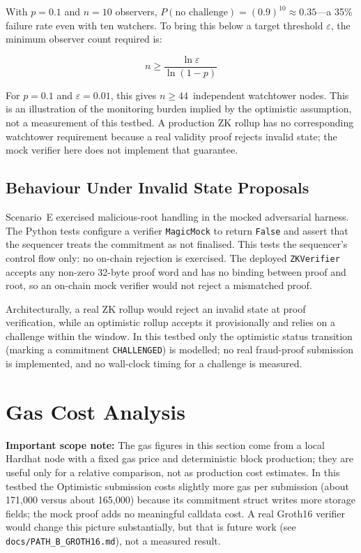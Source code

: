 With $p = 0.1$ and $n = 10$ observers, $P(\text{no challenge}) = (0.9)^{10} \approx 0.35$---a 35\% failure rate even with ten watchers. To bring this below a target threshold $\varepsilon$, the minimum observer count required is:

\begin{equation}
n \geq \frac{\ln \varepsilon}{\ln (1 - p)}
\end{equation}

For $p = 0.1$ and $\varepsilon = 0.01$, this gives $n \geq 44$~independent watchtower nodes. This is an illustration of the monitoring burden implied by the optimistic assumption, not a measurement of this testbed. A production ZK rollup has no corresponding watchtower requirement because a real validity proof rejects invalid state; the mock verifier here does not implement that guarantee.

\subsection{Behaviour Under Invalid State Proposals}
\label{sec:invalid-state}

Scenario~E exercised malicious-root handling in the mocked adversarial harness. The Python tests configure a verifier \texttt{MagicMock} to return \texttt{False} and assert that the sequencer treats the commitment as not finalised. This tests the sequencer's control flow only: no on-chain rejection is exercised. The deployed \texttt{ZKVerifier} accepts any non-zero 32-byte proof word and has no binding between proof and root, so an on-chain mock verifier would not reject a mismatched proof.

Architecturally, a real ZK rollup would reject an invalid state at proof verification, while an optimistic rollup accepts it provisionally and relies on a challenge within the window. In this testbed only the optimistic status transition (marking a commitment \texttt{CHALLENGED}) is modelled; no real fraud-proof submission is implemented, and no wall-clock timing for a challenge is measured.

\section{Gas Cost Analysis}
\label{sec:gas}

\textbf{Important scope note:} The gas figures in this section come from a local Hardhat node with a fixed gas price and deterministic block production; they are useful only for a relative comparison, not as production cost estimates. In this testbed the Optimistic submission costs slightly more gas per submission (about 171,000 versus about 165,000) because its commitment struct writes more storage fields; the mock proof adds no meaningful calldata cost. A real Groth16 verifier would change this picture substantially, but that is future work (see \texttt{docs/PATH\_B\_GROTH16.md}), not a measured result.

